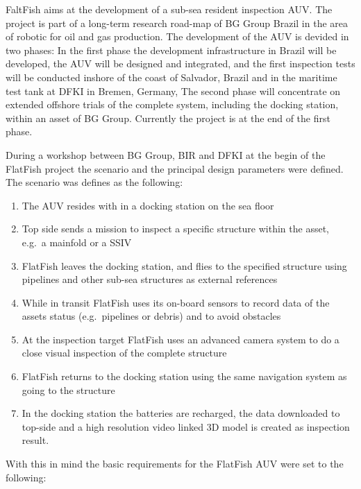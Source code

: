 \documentclass[conference]{IEEEtran}
\begin{document}
FaltFish aims at the development of a sub-sea resident inspection AUV. The project is part
of a long-term research road-map of BG Group Brazil in the area of robotic for oil and gas
production. The development of the AUV is devided in two phases: In the first phase the
development infrastructure in Brazil will be developed, the AUV will be designed and
integrated, and the first inspection tests will be conducted inshore of the coast of
Salvador, Brazil and in the maritime test tank at DFKI in Bremen, Germany, The second
phase will concentrate on extended offshore trials of the complete system, including the
docking station, within an asset of BG Group. Currently the project is at the end of the
first phase.

During a workshop between BG Group, BIR and DFKI at the begin of the FlatFish project the
scenario and the principal design parameters were defined. The scenario was defines as the
following:

\begin{enumerate}
    \item The AUV resides with in a docking station on the sea floor
    \item Top side sends a mission to inspect a specific structure within the asset,
        e.g.~a mainfold or a SSIV
    \item FlatFish leaves the docking station, and flies to the specified structure using
        pipelines and other sub-sea structures as external references
    \item While in transit FlatFish uses its on-board sensors to record data of the assets
        status (e.g.~pipelines or debris) and to avoid obstacles
    \item At the inspection target FlatFish uses an advanced camera system to do a close
        visual inspection of the complete structure
    \item FlatFish returns to the docking station using the same navigation system as
        going to the structure
    \item In the docking station the batteries are recharged, the data downloaded to
        top-side and a high resolution video linked 3D model is created as inspection
        result.
\end{enumerate}

With this in mind the basic requirements for the FlatFish AUV were set to the following:
\end{document}
